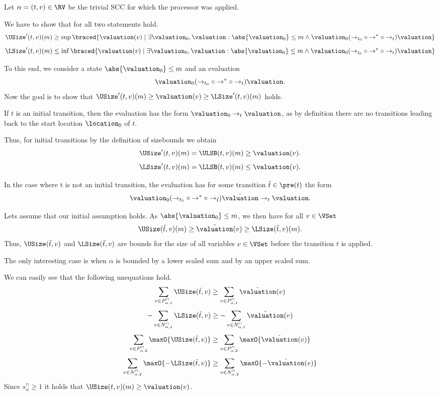 Let $\alpha = (t, v) \in \RV$ be the trivial SCC for which the processor was applied.

We have to show that for all  two statements hold.
\[ \USize'(t, v)(m) \geq \sup \braced{ \valuation(v) \mid \exists \valuation_0, \valuation: \abs{\valuation_0} \leq m \wedge \valuation_0 (\rightarrow_{t_0} \circ \rightarrow^* \circ \rightarrow_t) \valuation} \]
\[ \LSize'(t, v)(m) \leq \inf \braced{ \valuation(v) \mid \exists \valuation_0, \valuation: \abs{\valuation_0} \leq m \wedge \valuation_0 (\rightarrow_{t_0} \circ \rightarrow^* \circ \rightarrow_t) \valuation} \]

To this end, we consider a state $\abs{\valuation_0} \leq m$ and an evaluation
\[ \valuation_0 (\rightarrow_{t_0} \circ \rightarrow^* \circ \rightarrow_t) \valuation. \]
Now the goal is to show that $\USize'(t, v)(m) \geq \valuation(v) \geq \LSize'(t, v)(m)$ holds.

If $t$ is an initial transition, then the evaluation has the form $\valuation_0 \rightarrow_t \valuation$, as by definition there are no transitions leading back to the start location $\location_0$ of $t$.

Thus, for initial transitions by the definition of sizebounds we obtain
\[ \USize'(t, v)(m) = \ULSB(t, v)(m) \geq \valuation(v). \]
\[ \LSize'(t, v)(m) = \LLSB(t, v)(m) \leq \valuation(v). \]

In the case where t is not an initial transition, the evaluation has for some transition $\tilde{t} \in \pre(t)$ the form
\[ \valuation_0 (\rightarrow_{t_0} \circ \rightarrow^* \circ \rightarrow_{\tilde{t}}) \tilde{\valuation} \rightarrow_t \valuation. \]

Lets assume that our initial assumption holds.
As $\abs{\valuation_0} \leq m$, we then have for all $v \in \VSet$
\[ \USize(\tilde{t}, v)(m) \geq \tilde{\valuation}(v) \geq \LSize(\tilde{t}, v)(m). \]
Thus, $\USize(\tilde{t}, v)$ and $\LSize(\tilde{t}, v)$ are bounds for the size of all variables $v \in \VSet$ before the transition $t$ is applied.

The only interesting case is when $\alpha$ is bounded by a lower scaled sum and by an upper scaled sum.

We can easily see that the following unequations hold.
\[ \sum_{v \in P_{\alpha,1}^\sqcap} \USize(\tilde{t}, v) \geq \sum_{v \in P_{\alpha,1}^\sqcap} \tilde{\valuation}(v) \]
\[ - \sum_{v \in N_{\alpha,1}^\sqcap} \LSize(\tilde{t}, v) \geq - \sum_{v \in N_{\alpha,1}^\sqcap} \tilde{\valuation}(v) \]
\[ \sum_{v \in P_{\alpha,2}^\sqcap} \maxO{\USize(\tilde{t}, v)} \geq \sum_{v \in P_{\alpha,2}^\sqcap} \maxO{\tilde{\valuation}(v)} \]
\[ \sum_{v \in N_{\alpha,2}^\sqcap} \maxO{-\LSize(\tilde{t}, v)} \geq \sum_{v \in N_{\alpha,2}^\sqcap} \maxO{-\tilde{\valuation}(v)} \]
Since $s^\sqcap_\alpha \geq 1$ it holds that $\USize(t, v)(m) \geq \valuation(v)$.


